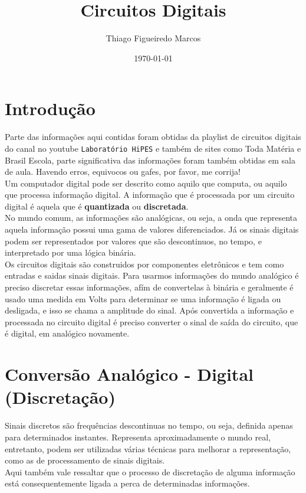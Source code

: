 \documentclass[12pt, onecolumn]{article}
\title{Circuitos Digitais}
\author{Thiago Figueiredo Marcos}
\date{\today}
\begin{document}
	
	\maketitle

	\section{\centering Introdução}
	
	Parte das informações aqui contidas foram obtidas da playlist de 
	circuitos digitais do canal no youtube \texttt{Laboratório HiPES} e também 
	de sites como Toda Matéria e Brasil Escola, parte significativa das 
	informações foram também obtidas em sala de aula. Havendo erros, equivocos 
	ou gafes, por favor, me corrija! \\
	\newline
	Um computador digital pode ser descrito como aquilo que computa, ou aquilo 
	que processa informação digital. A informação que é processada por 
	um circuito digital é aquela que é \textbf{quantizada} ou 
	\textbf{discretada}. \\
	\newline
	No mundo comum, as informações são analógicas, ou seja, a onda que 
	representa aquela informação possui uma gama de valores diferenciados. 
	Já os sinais digitais podem ser representados por valores que são descontinuos, 
	no tempo, e interpretado por uma lógica binária. \\ 
	\newline
	Os circuitos digitais são construidos por componentes eletrônicos e 
	tem como entradas e saidas sinais digitais. Para usarmos informações 
	do mundo analógico é preciso discretar essas informações, afím de 
	convertelas à binária e geralmente é usado uma medida em Volts para 
	determinar se uma informação é ligada ou desligada, e isso se chama a
	amplitude do sinal. 
	Após convertida a informação e processada no circuito digital é 
	preciso converter o sinal de saída do circuito, que é digital, 
	em analógico novamente.

	\section{\centering Conversão Analógico - Digital (Discretação)}
	
	Sinais discretos são frequências descontinuas no tempo, ou seja, 
	definida apenas para determinados instantes. Representa aproximadamente 
	o mundo real, entretanto, podem ser utilizadas várias técnicas para 
	melhorar a representação, como as de processamento de sinais digitais.\\
	\newline
	Aqui também vale ressaltar que o processo de discretação de alguma 
	informação está consequentemente ligada a perca de determinadas 
	informações.
		
\end{document}
